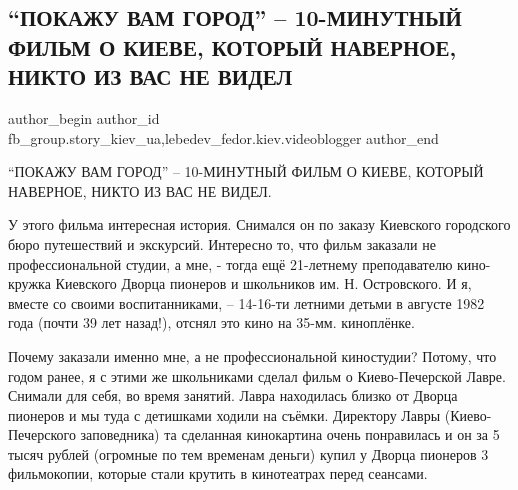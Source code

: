  
 
 
 
 
 
\subsection{\enquote{ПОКАЖУ ВАМ ГОРОД} – 10-МИНУТНЫЙ ФИЛЬМ О КИЕВЕ, КОТОРЫЙ НАВЕРНОЕ, НИКТО ИЗ ВАС НЕ ВИДЕЛ}
\label{sec:06_02_2021.fb.fb_group.story_kiev_ua.1.pokazhu_vam_gorod}
 
\ifcmt
 author_begin
   author_id fb_group.story_kiev_ua,lebedev_fedor.kiev.videoblogger
 author_end
\fi

\enquote{ПОКАЖУ ВАМ ГОРОД} – 10-МИНУТНЫЙ ФИЛЬМ О КИЕВЕ,  КОТОРЫЙ НАВЕРНОЕ, НИКТО ИЗ ВАС
НЕ ВИДЕЛ.

У этого фильма интересная история. Снимался он по заказу Киевского городского
бюро путешествий и экскурсий. Интересно то, что фильм заказали не
профессиональной студии, а мне, - тогда ещё 21\hyp летнему преподавателю
кино-кружка Киевского Дворца пионеров и школьников им. Н. Островского. И я,
вместе со своими воспитанниками, – 14\hyp 16\hyp ти летними детьми в августе 1982 года
(почти 39 лет назад!), отснял это кино на 35-мм. киноплёнке. 


Почему заказали именно мне, а не профессиональной киностудии? Потому, что годом
ранее, я с этими же школьниками сделал фильм о Киево-Печерской Лавре. Снимали
для себя, во время занятий. Лавра находилась близко от Дворца пионеров и мы
туда с детишками ходили на съёмки. Директору Лавры (Киево-Печерского
заповедника) та сделанная кинокартина очень понравилась и он за 5 тысяч рублей
(огромные по тем временам деньги) купил у Дворца пионеров 3 фильмокопии,
которые стали крутить в кинотеатрах перед сеансами.


